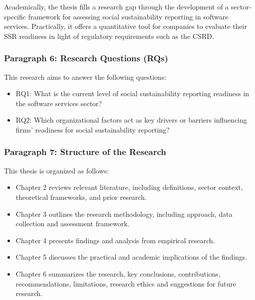 Academically, the thesis fills a research gap through the 
development of a sector-specific framework for assessing social sustainability
reporting in software services. Practically, it offers a quantitative tool 
for companies to evaluate their SSR readiness in light of regulatory 
requirements such as the CSRD.

\subsubsection{Paragraph 6: Research Questions (RQs)}
This research aims to answer the following questions:
\begin{itemize}
    \item RQ1: What is the current level of social sustainability reporting readiness 
    in the software services sector?
    \item RQ2: Which organizational factors act as key drivers or barriers 
    influencing firms' readiness for social sustainability reporting?
\end{itemize}

\subsubsection{Paragraph 7: Structure of the Research}
This thesis is organized as follows:
\begin{itemize}
    \item Chapter 2 reviews relevant literature, including definitions, 
    sector context, theoretical frameworks, and prior research.
    \item Chapter 3 outlines the research methodology, including approach, 
    data collection and assessment framework.
    \item Chapter 4 presents findings and analysis from empirical research.
    \item Chapter 5 discusses the practical and academic implications of the findings.
    \item Chapter 6 summarizes the research, key conclusions, contributions, 
    recommendations, limitations, research ethics and suggestions for future research.
\end{itemize}